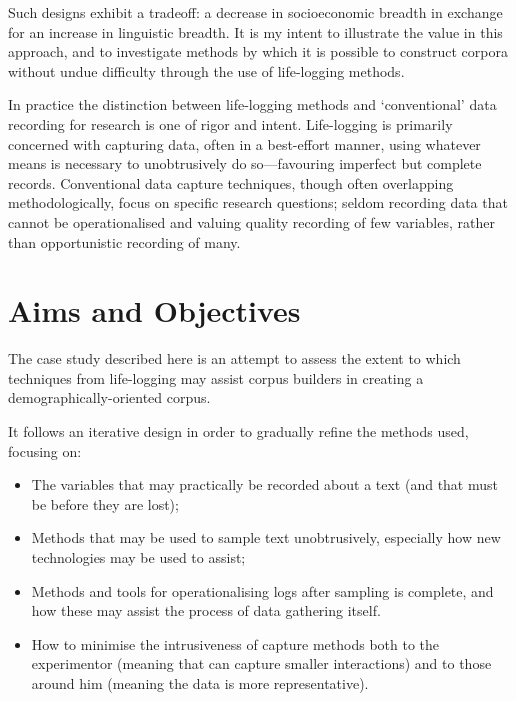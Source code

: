 Such designs exhibit a tradeoff: a decrease in socioeconomic breadth in exchange for an increase in linguistic breadth.  It is my intent to illustrate the value in this approach, and to investigate methods by which it is possible to construct corpora without undue difficulty through the use of life-logging methods.






In practice the distinction between life-logging methods and `conventional' data recording for research is one of rigor and intent.  Life-logging is primarily concerned with capturing data, often in a best-effort manner, using whatever means is necessary to unobtrusively do so---favouring imperfect but complete records.  Conventional data capture techniques, though often overlapping methodologically, focus on specific research questions; seldom recording data that cannot be operationalised and valuing quality recording of few variables, rather than opportunistic recording of many.











\section{Aims and Objectives}
The case study described here is an attempt to assess the extent to which techniques from life-logging may assist corpus builders in creating a demographically-oriented corpus.

It follows an iterative design in order to gradually refine the methods used, focusing on:

\begin{itemize}
    \item The variables that may practically be recorded about a text (and that must be before they are lost);
    \item Methods that may be used to sample text unobtrusively, especially how new technologies may be used to assist;
    \item Methods and tools for operationalising logs after sampling is complete, and how these may assist the process of data gathering itself.
    \item How to minimise the intrusiveness of capture methods both to the experimentor (meaning that can capture smaller interactions) and to those around him (meaning the data is more representative).
\end{itemize}

